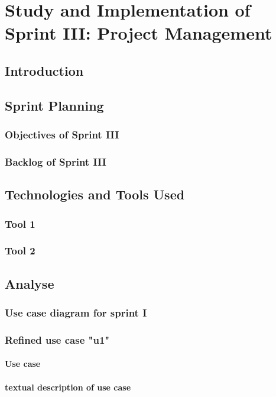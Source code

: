 \chapter[Sprint III]{Study and Implementation of Sprint III: Project Management}

\minitoc
\section{Introduction}
\section{Sprint Planning}
\subsection{Objectives of Sprint III}
\subsection{Backlog of Sprint III}
\section{Technologies and Tools Used}
\subsection{Tool 1}
\subsection{Tool 2}

\section{Analyse}
\subsection{Use case diagram for sprint I}
\subsection{Refined use case "u1"}
\subsubsection{Use case}
\subsubsection{textual description of use case}
